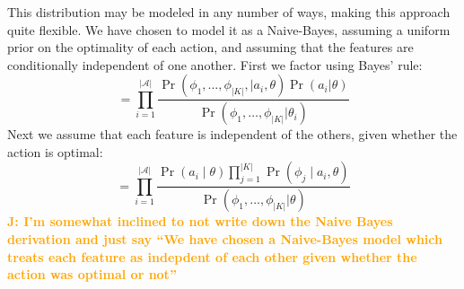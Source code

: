 \documentclass[conference]{IEEEtran}
\newcommand{\jnote}[1]{\textcolor{Orange}{\textbf{J: #1}}}
\begin{document}


This distribution may
be modeled in any number of ways, making this approach quite flexible.
We have chosen to model it as a Naive-Bayes, assuming a uniform prior
on the optimality of each action, and assuming that the features are
conditionally independent of one another.  First we factor using Bayes' rule:
\begin{equation}
= \prod_{i=1}^{|\mathcal{A}|} \frac{\Pr(\phi_1, \ldots, \phi_{|K|}, \mid a_i, \theta) \Pr(a_i | \theta)}{\Pr(\phi_1, \ldots, \phi_{|K|} | \theta_i)}
\label{eq:bayes}
\end{equation}
Next we assume that each feature is independent of the others, given
whether the action is optimal:
\begin{equation}
= \prod_{i=1}^{|\mathcal{A}|} \frac{\Pr(a_i \mid \theta) \prod_{j=1}^{|K|} \Pr(\phi_j \mid a_i, \theta) }{\Pr(\phi_1, \ldots, \phi_{|K|} | \theta)}
\label{eq:final}
\end{equation}
\jnote{I'm somewhat inclined to not write down the Naive Bayes derivation and just say ``We have chosen a Naive-Bayes model which treats each feature as indepdent of each other given whether the action was optimal or not''}
\end{document}
